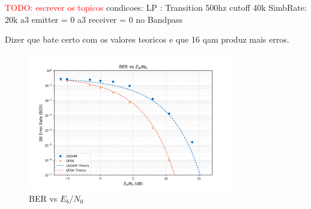 \textcolor{red}{TODO: escrever os topicos}
condicoes:
    LP : Transition 500hz cutoff 40k
    SimbRate: 20k
    a3 emitter  = 0
    a3 receiver = 0
    no Bandpass

Dizer que bate certo com os valores teoricos e que 16 qam produz mais erros.

\begin{figure}[H]
    \centering
    \includegraphics*[width=0.8\textwidth]{Images/BER_SNR_a3_0.png}
    \caption{BER vs $E_b/N_0$}
    \label{fig:BER_SNR_a3_0}
\end{figure}